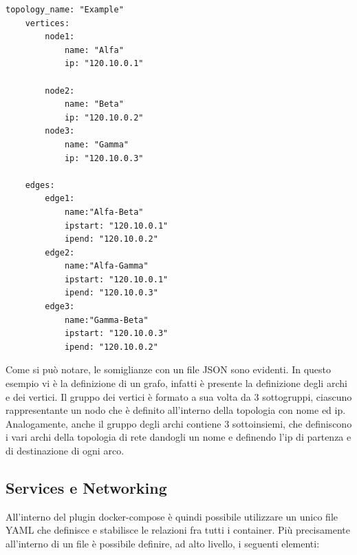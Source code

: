 \begin{lstlisting}[style=yaml,caption={Esempio definizione di un file YAML},label=lst:yamlexample]
    topology_name: "Example"
    vertices: 
        node1:
            name: "Alfa"
            ip: "120.10.0.1"

        node2:
            name: "Beta"
            ip: "120.10.0.2"
        node3:
            name: "Gamma"
            ip: "120.10.0.3"
    
    edges:
        edge1:
            name:"Alfa-Beta"
            ipstart: "120.10.0.1"
            ipend: "120.10.0.2"
        edge2:
            name:"Alfa-Gamma"
            ipstart: "120.10.0.1"
            ipend: "120.10.0.3"
        edge3:
            name:"Gamma-Beta"
            ipstart: "120.10.0.3"
            ipend: "120.10.0.2"   

\end{lstlisting}

Come si può notare, le somiglianze con un file JSON sono evidenti. In questo esempio vi è la definizione di un grafo, infatti è presente la definizione
degli archi e dei vertici. Il gruppo dei vertici è formato a sua volta da 3 sottogruppi, ciascuno rappresentante un nodo che è definito all'interno della 
topologia con nome ed ip. Analogamente, anche il gruppo degli archi contiene 3 sottoinsiemi, che definiscono i vari archi della topologia di rete dandogli un nome e definendo
l'ip di partenza e di destinazione di ogni arco.\\

\subsection{Services e Networking}
All'interno del plugin docker-compose è quindi possibile utilizzare un unico file YAML che definisce e stabilisce le relazioni fra tutti i container. Più precisamente all'interno
di un file è possibile definire, ad alto livello, i seguenti elementi:

